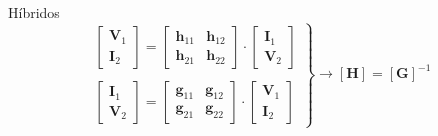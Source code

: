 \documentclass[xcolor={usenames,svgnames,dvipsnames}]{beamer}
\begin{document}
\begin{frame}[label={sec:orgcc3ffb4}]{Híbridos}
\[
  \left.
    \begin{array}{l}
  \left[
    \begin{array}{c}
      \mathbf{V}_1\\
      \mathbf{I}_2
    \end{array}
  \right] =
  \left[
    \begin{array}{cc}
      \mathbf{h}_{11} & \mathbf{h}_{12}\\
      \mathbf{h}_{21} & \mathbf{h}_{22}
    \end{array}
  \right] \cdot
  \left[
    \begin{array}{c}
      \mathbf{I}_1\\
      \mathbf{V}_2
    \end{array}
      \right]
      \\ \\
  \left[
    \begin{array}{c}
      \mathbf{I}_1\\
      \mathbf{V}_2
    \end{array}
  \right] =
  \left[
    \begin{array}{cc}
      \mathbf{g}_{11} & \mathbf{g}_{12}\\
      \mathbf{g}_{21} & \mathbf{g}_{22}
    \end{array}
  \right] \cdot
  \left[
    \begin{array}{c}
      \mathbf{V}_1\\
      \mathbf{I}_2
    \end{array}
      \right]
      \end{array}
    \right\}
      \rightarrow
      \boxed{[\mathbf{H}] = [\mathbf{G}]^{-1}}
    \]
\end{frame}
\end{document}

